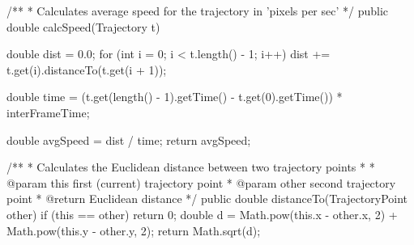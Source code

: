 /**
* Calculates average speed for the trajectory in 'pixels per sec'
*/
public double calcSpeed(Trajectory t) {
	double dist = 0.0;
	for (int i = 0; i < t.length() - 1; i++) {
		dist += t.get(i).distanceTo(t.get(i + 1));
	}
	
	double time = (t.get(length() - 1).getTime() - t.get(0).getTime()) * interFrameTime;
	
	double avgSpeed = dist / time;
	return avgSpeed;
}

/**
* Calculates the Euclidean distance between two trajectory points
* 
* @param this      first (current) trajectory point
* @param other     second trajectory point
* @return          Euclidean distance
*/
public double distanceTo(TrajectoryPoint other) {
	if (this == other) {
		return 0;
	}
	double d = Math.pow(this.x - other.x, 2) + Math.pow(this.y - other.y, 2);
	return Math.sqrt(d);
}

